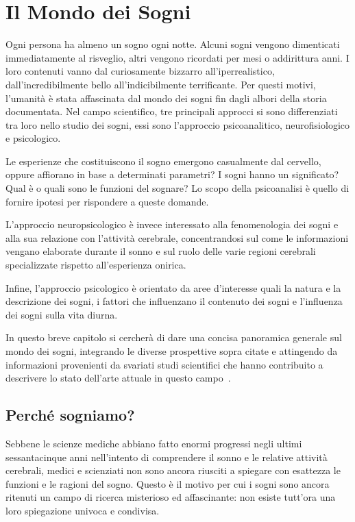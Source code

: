 \chapter{Il Mondo dei Sogni} \label{cap:mondo-dei-sogni}

Ogni persona ha almeno un sogno ogni notte.
Alcuni sogni vengono dimenticati immediatamente al risveglio, altri vengono ricordati per mesi o addirittura anni.
I loro contenuti vanno dal curiosamente bizzarro all'iperrealistico, dall'incredibilmente bello all'indicibilmente
terrificante.
Per questi motivi, l'umanità è stata affascinata dal mondo dei sogni fin dagli albori della storia documentata.
Nel campo scientifico, tre principali approcci si sono differenziati tra loro nello studio dei sogni, essi sono
l'approccio psicoanalitico, neurofisiologico e psicologico.

Le esperienze che costituiscono il sogno emergono casualmente dal cervello, oppure affiorano in base a determinati
parametri?
I sogni hanno un significato?
Qual è o quali sono le funzioni del sognare?
Lo scopo della psicoanalisi è quello di fornire ipotesi per rispondere a queste domande.

L'approccio neuropsicologico è invece interessato alla fenomenologia dei sogni e alla sua relazione con l'attività
cerebrale, concentrandosi sul come le informazioni vengano elaborate durante il sonno e sul ruolo delle varie regioni
cerebrali specializzate rispetto all'esperienza onirica.

Infine, l'approccio psicologico è orientato da aree d'interesse quali
la natura e la descrizione dei sogni, i fattori che influenzano il contenuto dei sogni e l'influenza dei sogni sulla
vita diurna.

In questo breve capitolo si cercherà di dare una concisa panoramica generale sul mondo dei sogni, integrando le diverse
prospettive sopra citate e attingendo da informazioni provenienti da svariati studi scientifici che hanno contribuito
a descrivere lo stato dell'arte attuale in questo campo~\cite{Ruby2011ExperimentalRO, Akhtar2022, Schredl2005}.


\section{Perché sogniamo?}
Sebbene le scienze mediche abbiano fatto enormi progressi negli ultimi sessantacinque anni nell'intento di comprendere
il sonno e le relative attività cerebrali, medici e scienziati non sono ancora riusciti a spiegare con esattezza le
funzioni e le ragioni del sogno.
Questo è il motivo per cui i sogni sono ancora ritenuti un campo di ricerca misterioso ed affascinante: non esiste
tutt'ora una loro spiegazione univoca e condivisa.

